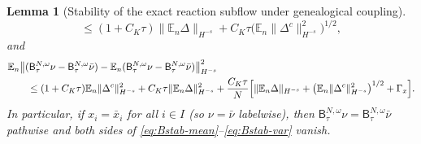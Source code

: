 \documentclass[a4paper,fleqn]{cas-sc}
\newtheorem{lemma}[theorem]{Lemma}
\theoremstyle{definition}
\theoremstyle{remark}
\begin{document}
\begin{lemma}[Stability of the exact reaction subflow under genealogical coupling]
\begin{equation}
\le(1+C_K\tau)\|\mathbb E_n\Delta\|_{H^{-s}}
+C_K\tau\bigl(\mathbb E_n\|\Delta^c\|_{H^{-s}}^2\bigr)^{1/2},
\end{equation}
and
\begin{equation}\label{eq:Bstab-var}
\begin{aligned}
&\mathbb E_n\bigl\|(\mathsf B^{N,\omega}_\tau\nu-\mathsf B^{N,\omega}_\tau\bar\nu)
-\mathbb E_n(\mathsf B^{N,\omega}_\tau\nu-\mathsf B^{N,\omega}_\tau\bar\nu)\bigr\|_{H^{-s}}^2\\
&\qquad\le(1+C_K\tau)\mathbb E_n\|\Delta^c\|_{H^{-s}}^2
+C_K\tau\|\mathbb E_n\Delta\|_{H^{-s}}^2
+\frac{C_K\tau}{N}\Bigl[\|\mathbb E_n\Delta\|_{H^{-s}}
+\bigl(\mathbb E_n\|\Delta^c\|_{H^{-s}}^2\bigr)^{1/2}+\Gamma_x\Bigr].
\end{aligned}
\end{equation}
In particular, if $x_i=\bar x_i$ for all $i\in I$ (so $\nu=\bar\nu$ labelwise),
then $\mathsf B^{N,\omega}_\tau\nu=\mathsf B^{N,\omega}_\tau\bar\nu$ pathwise and
both sides of \eqref{eq:Bstab-mean}--\eqref{eq:Bstab-var} vanish.
\end{lemma}
\end{document}
